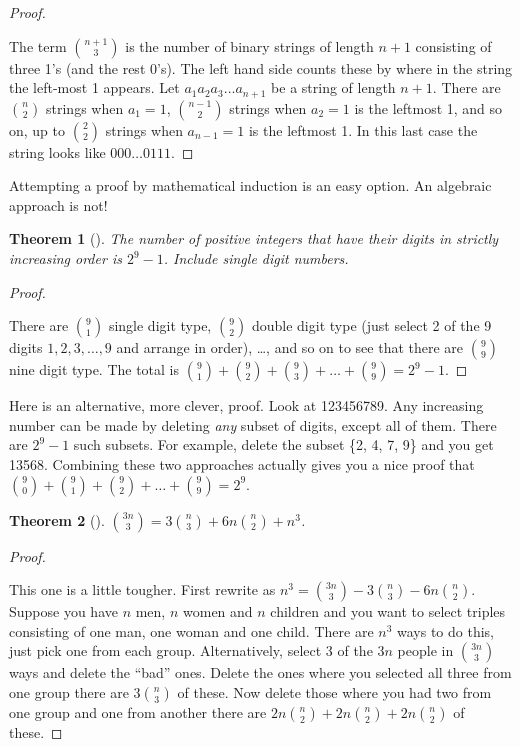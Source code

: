 \documentclass[10pt,]{book}
\theoremstyle{plain}
\newtheorem{theorem}{Theorem}[section]
\theoremstyle{definition}
\theoremstyle{definition}
\numberwithin{equation}{chapter}
\begin{document}
\begin{proof}\hypertarget{proof-11}{}
\hypertarget{p-302}{}%
The term \(\binom{n + 1}{3}\) is the number of binary strings of length \(n + 1\) consisting of three 1's (and the rest 0's). The left hand side counts these by where in the string the left-most 1 appears. Let \(a_{1}a_{2}a_{3}\ldots a_{n + 1}\) be a string of length \(n + 1\). There are \(\binom{n}{2}\) strings when \(a_{1} = 1\), \(\binom{n - 1}{2}\) strings when \(a_{2} = 1\) is the leftmost 1, and so on, up to \(\binom{2}{2}\) strings when \(a_{n - 1} = 1\) is the leftmost 1. In this last case the string looks like \(000\ldots 0111\).%
\end{proof}
\hypertarget{p-303}{}%
Attempting a proof by mathematical induction is an easy option. An algebraic approach is not!%
\begin{theorem}[{}]\label{theorem-14}
\hypertarget{p-304}{}%
The number of positive integers that have their digits in strictly increasing order is \(2^{9} - 1\). Include single digit numbers.%
\end{theorem}
\begin{proof}\hypertarget{proof-12}{}
\hypertarget{p-305}{}%
There are \(\binom{9}{1}\) single digit type, \(\binom{9}{2}\) double digit type (just select 2 of the 9 digits \(1, 2, 3, \ldots, 9\) and arrange in order), \ldots, and so on to see that there are \(\binom{9}{9}\) nine digit type. The total is \(\binom{9}{1} + \binom{9}{2} + \binom{9}{3} + \ldots + \binom{9}{9} = 2^{9} - 1\).%
\end{proof}
\hypertarget{p-306}{}%
Here is an alternative, more clever, proof. Look at 123456789. Any increasing number can be made by deleting \emph{any} subset of digits, except all of them. There are \(2^{9} - 1\) such subsets. For example, delete the subset \{2, 4, 7, 9\} and you get 13568. Combining these two approaches actually gives you a nice proof that \(\binom{9}{0} + \binom{9}{1} + \binom{9}{2} + \ldots + \binom{9}{9} = 2^{9}\).%
\begin{theorem}[{}]\label{theorem-15}
\hypertarget{p-307}{}%
\(\binom{3n}{3} = 3 \binom{n}{3} + 6n \binom{n}{2} + n^{3}\).%
\end{theorem}
\begin{proof}\hypertarget{proof-13}{}
\hypertarget{p-308}{}%
This one is a little tougher. First rewrite as \(n^{3} = \binom{3n}{3} - 3 \binom{n}{3} - 6n \binom{n}{2}\). Suppose you have \(n\) men, \(n\) women and \(n\) children and you want to select triples consisting of one man, one woman and one child. There are \(n^{3}\) ways to do this, just pick one from each group. Alternatively, select 3 of the \(3n\) people in \(\binom{3n}{3}\) ways and delete the ``bad'' ones. Delete the ones where you selected all three from one group \textemdash{} there are \(3 \binom{n}{3}\) of these. Now delete those where you had two from one group and one from another \textemdash{} there are \(2n \binom{n}{2} + 2n \binom{n}{2} + 2n \binom{n}{2}\) of these.%
\end{proof}
\end{document}
